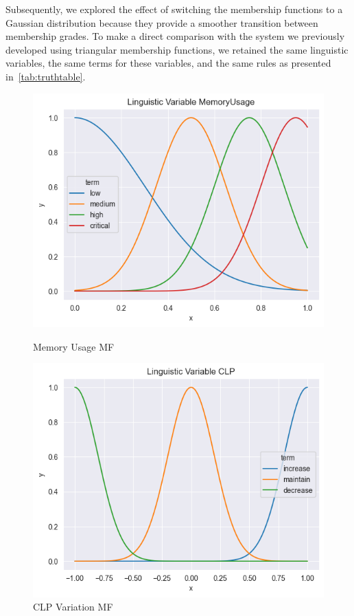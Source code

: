 \documentclass[titlepage]{article}
\begin{document}
Subsequently, we explored the effect of switching the membership functions to a Gaussian distribution because they provide a smoother transition between membership grades.
To make a direct comparison with the system we previously developed using triangular membership functions, we retained the same linguistic variables, the same terms for these variables, and the same rules as presented in~\cref{tab:truthtable}.

\begin{figure}[htbp]
    \centering
    \begin{minipage}{0.45\textwidth}
        \centering
        \includegraphics[width=\textwidth]{../images/guassian_MemoryUsage}
        \caption{Memory Usage MF}
        \label{fig:memory_usage_gaussian}
    \end{minipage}
    \hfill
    \begin{minipage}{0.45\textwidth}
        \centering
        \includegraphics[width=\textwidth]{../images/guassian_CLP}
        \caption{CLP Variation MF}
        \label{fig:clp_gaussian}
    \end{minipage}
\end{figure}
\end{document}
